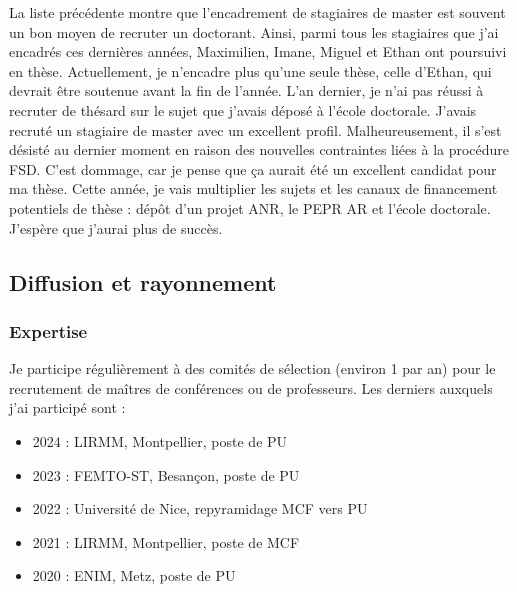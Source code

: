 \documentclass[a4paper,12pt]{article}
\begin{document}
La liste précédente montre que l'encadrement de stagiaires de master est souvent un bon moyen de recruter un doctorant. Ainsi, parmi tous les stagiaires que j'ai encadrés ces dernières années, Maximilien, Imane, Miguel et Ethan ont poursuivi en thèse. Actuellement, je n'encadre plus qu'une seule thèse, celle d'Ethan, qui devrait être soutenue avant la fin de l'année. L'an dernier, je n'ai pas réussi à recruter de thésard sur le sujet que j'avais déposé à l'école doctorale. J'avais recruté un stagiaire de master avec un excellent profil. Malheureusement, il s'est désisté au dernier moment en raison des nouvelles contraintes liées à la procédure FSD. C'est dommage, car je pense que ça aurait été un excellent candidat pour ma thèse. Cette année, je vais multiplier les sujets et les canaux de financement potentiels de thèse : dépôt d'un projet ANR, le PEPR AR et l'école doctorale. J'espère que j'aurai plus de succès.

\subsection{Diffusion et rayonnement}


\subsubsection{Expertise}

Je participe régulièrement à des comités de sélection (environ 1 par an) pour le recrutement de maîtres de conférences ou de professeurs. Les derniers auxquels j'ai participé sont :
\begin{itemize}
    \item 2024 : LIRMM, Montpellier, poste de PU
    \item 2023 : FEMTO-ST, Besançon, poste de PU
    \item 2022 : Université de Nice, repyramidage MCF vers PU
    \item 2021 : LIRMM, Montpellier, poste de MCF
    \item 2020 : ENIM, Metz, poste de PU
\end{itemize}
\end{document}

